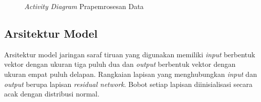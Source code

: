 \begin{figure}[htbp]
    \begin{center}
    \end{center}
    \vspace{-20pt}
    \captionsetup{labelfont=bf, textfont=bf}
    \caption{\textit{Activity Diagram} Prapemrosesan Data}
    \vspace{-10pt}
    \captionsetup{labelfont=md, textfont=md}
    \label{fig:act_diagram}
\end{figure}

\subsection{Arsitektur Model}

Arsitektur model jaringan saraf tiruan yang digunakan memiliki \textit{input} berbentuk vektor dengan ukuran
tiga puluh dua dan \textit{output} berbentuk vektor dengan ukuran empat puluh delapan. Rangkaian lapisan yang
menghubungkan \textit{input} dan \textit{output} berupa lapisan \textit{residual network}. Bobot setiap
lapisan diinisialisasi secara acak dengan distribusi normal.

